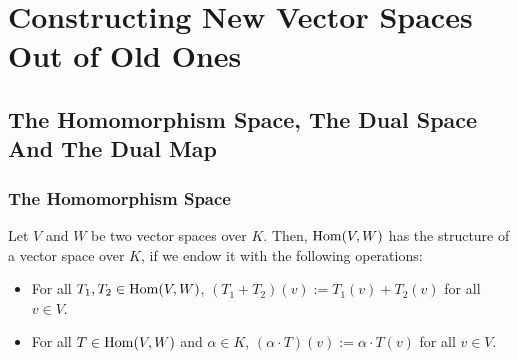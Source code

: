 \renewcommand{\thetheorem}{18.a.\arabic{theorem}}
\setcounter{theorem}{0}
\setcounter{chapter}{17} %

\chapter{Constructing New Vector Spaces Out of Old Ones}


\setcounter{section}{0}
\section{The Homomorphism Space, The Dual Space And The Dual Map}

\subsection{The Homomorphism Space}

\begin{proposition}
  \label{prop:hom_vector_space}
  Let $V$ and $W$ be two vector spaces over $K$. Then, $\operatorname{Hom}(V,W)$ has the structure of a vector space over $K$, if we endow it with the following operations:
  \begin{itemize}
    \item For all $T_1, T_2 \in \operatorname{Hom}(V,W)$, $(T_1 + T_2)(v) := T_1(v) + T_2(v)$ for all $v \in V$.
    \item For all $T \in \operatorname{Hom}(V,W)$ and $\alpha \in K$, $(\alpha \cdot T)(v) := \alpha \cdot T(v)$ for all $v \in V$.
  \end{itemize}
\end{proposition} 

